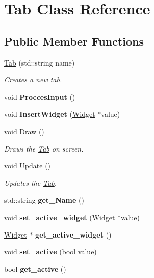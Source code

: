 \hypertarget{class_tab}{}\section{Tab Class Reference}
\label{class_tab}
\subsection*{Public Member Functions}
\begin{DoxyCompactItemize}
\item 
\hyperlink{class_tab_a497b3e128d1fe6625b9f3734fba8b416}{Tab} (std\+::string name)
\begin{DoxyCompactList}\small\item\em Creates a new tab. \end{DoxyCompactList}\item 
\mbox{\label{class_tab_aec6e556831d7efa5f510d9f0ab859b56}} 
void {\bfseries Procces\+Input} ()
\item 
\mbox{\label{class_tab_abf76c4aa09eb2c2ed239b7ae9d400301}} 
void {\bfseries Insert\+Widget} (\hyperlink{class_widget}{Widget} $\ast$value)
\item 
void \hyperlink{class_tab_ae9db0c3ae8b0b75f7c5b3493b0267482}{Draw} ()
\begin{DoxyCompactList}\small\item\em Draws the \hyperlink{class_tab}{Tab} on screen. \end{DoxyCompactList}\item 
void \hyperlink{class_tab_a67a6f492fc37ea3632604802f10a4f18}{Update} ()
\begin{DoxyCompactList}\small\item\em Updates the \hyperlink{class_tab}{Tab}. \end{DoxyCompactList}\item 
\mbox{\label{class_tab_ab66bde58841ba5149c4fc3d4748d9910}} 
std\+::string {\bfseries get\+\_\+\+Name} ()
\item 
\mbox{\label{class_tab_ae939018aba71c1de9be971553a5a76ee}} 
void {\bfseries set\+\_\+active\+\_\+widget} (\hyperlink{class_widget}{Widget} $\ast$value)
\item 
\mbox{\label{class_tab_af11a3e34e8f1e987728bba121643c2d4}} 
\hyperlink{class_widget}{Widget} $\ast$ {\bfseries get\+\_\+active\+\_\+widget} ()
\item 
\mbox{\label{class_tab_a65088c5332b105d860280e098949bc2b}} 
void {\bfseries set\+\_\+active} (bool value)
\item 
\mbox{\label{class_tab_ad68e1eda0c9eb8526dc60591914813e1}} 
bool {\bfseries get\+\_\+active} ()
\end{DoxyCompactItemize}


